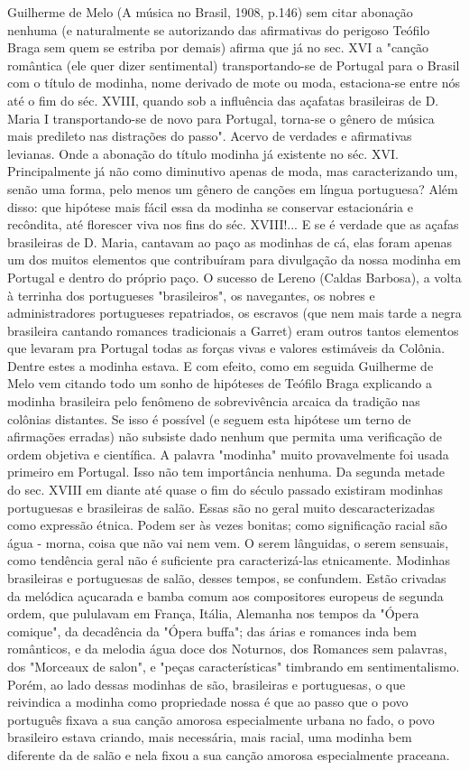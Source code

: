 Guilherme de Melo (A música no Brasil, 1908, p.146) sem citar abonação
nenhuma (e naturalmente se autorizando das afirmativas do perigoso
Teófilo Braga sem quem se estriba por demais) afirma que já no sec. XVI
a "canção romântica (ele quer dizer sentimental) transportando-se de
Portugal para o Brasil com o título de modinha, nome derivado de mote ou
moda, estaciona-se entre nós até o fim do séc. XVIII, quando sob a
influência das açafatas brasileiras de D. Maria I transportando-se de
novo para Portugal, torna-se o gênero de música mais predileto nas
distrações do passo". Acervo de verdades e afirmativas levianas. Onde a
abonação do título modinha já existente no séc. XVI. Principalmente já
não como diminutivo apenas de moda, mas caracterizando um, senão uma
forma, pelo menos um gênero de canções em língua portuguesa? Além disso:
que hipótese mais fácil essa da modinha se conservar estacionária e
recôndita, até florescer viva nos fins do séc. XVIII!... E se é verdade
que as açafas brasileiras de D. Maria, cantavam ao paço as modinhas de
cá, elas foram apenas um dos muitos elementos que contribuíram para
divulgação da nossa modinha em Portugal e dentro do próprio paço. O
sucesso de Lereno (Caldas Barbosa), a volta à terrinha dos portugueses
"brasileiros", os navegantes, os nobres e administradores portugueses
repatriados, os escravos (que nem mais tarde a negra brasileira cantando
romances tradicionais a Garret) eram outros tantos elementos que levaram
pra Portugal todas as forças vivas e valores estimáveis da Colônia.
Dentre estes a modinha estava. E com efeito, como em seguida Guilherme
de Melo vem citando todo um sonho de hipóteses de Teófilo Braga
explicando a modinha brasileira pelo fenômeno de sobrevivência arcaica
da tradição nas colônias distantes. Se isso é possível (e seguem esta
hipótese um terno de afirmações erradas) não subsiste dado nenhum que
permita uma verificação de ordem objetiva e científica. A palavra
"modinha" muito provavelmente foi usada primeiro em Portugal. Isso não
tem importância nenhuma. Da segunda metade do sec. XVIII em diante até
quase o fim do século passado existiram modinhas portuguesas e
brasileiras de salão. Essas são no geral muito descaracterizadas como
expressão étnica. Podem ser às vezes bonitas; como significação racial
são água - morna, coisa que não vai nem vem. O serem lânguidas, o serem
sensuais, como tendência geral não é suficiente pra caracterizá-las
etnicamente. Modinhas brasileiras e portuguesas de salão, desses tempos,
se confundem. Estão crivadas da melódica açucarada e bamba comum aos
compositores europeus de segunda ordem, que pululavam em França, Itália,
Alemanha nos tempos da "Ópera comique", da decadência da "Ópera buffa";
das árias e romances inda bem românticos, e da melodia água doce dos
Noturnos, dos Romances sem palavras, dos "Morceaux de salon", e "peças
características" timbrando em sentimentalismo. Porém, ao lado dessas
modinhas de são, brasileiras e portuguesas, o que reivindica a modinha
como propriedade nossa é que ao passo que o povo português fixava a sua
canção amorosa especialmente urbana no fado, o povo brasileiro estava
criando, mais necessária, mais racial, uma modinha bem diferente da de
salão e nela fixou a sua canção amorosa especialmente praceana.


